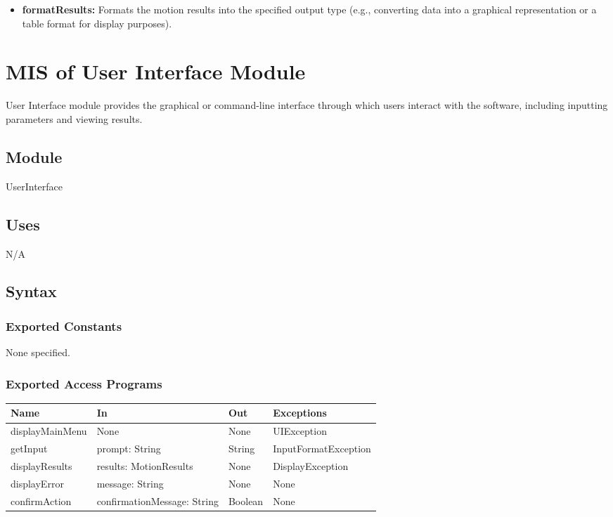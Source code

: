 \documentclass[12pt, titlepage]{article}
\begin{document}
\begin{itemize}
  \item \textbf{formatResults:} Formats the motion results into the specified output type (e.g., converting data into a graphical representation or a table format for display purposes).
\end{itemize}



\section{MIS of User Interface Module} \label{mUIM}

User Interface module provides the graphical or command-line interface through which users interact
with the software, including inputting parameters and viewing results.

\subsection{Module}
UserInterface

\subsection{Uses}
N/A

\subsection{Syntax}

\subsubsection{Exported Constants}
None specified.

\subsubsection{Exported Access Programs}

\begin{center}
\begin{tabular}{p{4cm} p{4cm} p{3cm} p{5cm}}
\hline
\textbf{Name} & \textbf{In} & \textbf{Out} & \textbf{Exceptions} \\
\hline
displayMainMenu & None & None & UIException \\
getInput & prompt: String & String & InputFormatException \\
displayResults & results: MotionResults & None & DisplayException \\
displayError & message: String & None & None \\
confirmAction & confirmationMessage: String & Boolean & None \\
\hline
\end{tabular}
\end{center}
\end{document}
